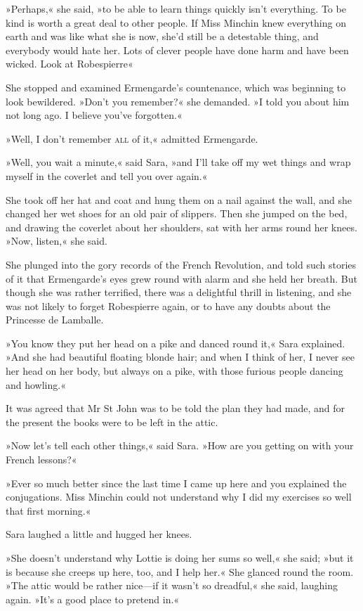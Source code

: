 »Perhaps,« she said, »to be able to learn things quickly isn't everything. To be kind is worth a great deal to other people. If Miss Minchin knew everything on earth and was like what she is now, she'd still be a detestable thing, and everybody would hate her. Lots of clever people have done harm and have been wicked. Look at Robespierre\longdash«

She stopped and examined Ermengarde's countenance, which was beginning to look bewildered. »Don't you remember?« she demanded. »I told you about him not long ago. I believe you've forgotten.«

»Well, I don't remember \textsc{all} of it,« admitted Ermengarde.

»Well, you wait a minute,« said Sara, »and I'll take off my wet things and wrap myself in the coverlet and tell you over again.«

She took off her hat and coat and hung them on a nail against the wall, and she changed her wet shoes for an old pair of slippers. Then she jumped on the bed, and drawing the coverlet about her shoulders, sat with her arms round her knees. »Now, listen,« she said.

She plunged into the gory records of the French Revolution, and told such stories of it that Ermengarde's eyes grew round with alarm and she held her breath. But though she was rather terrified, there was a delightful thrill in listening, and she was not likely to forget Robespierre again, or to have any doubts about the Princesse de Lamballe.

»You know they put her head on a pike and danced round it,« Sara explained. »And she had beautiful floating blonde hair; and when I think of her, I never see her head on her body, but always on a pike, with those furious people dancing and howling.«

It was agreed that Mr St John was to be told the plan they had made, and for the present the books were to be left in the attic.

»Now let's tell each other things,« said Sara. »How are you getting on with your French lessons?«

»Ever so much better since the last time I came up here and you explained the conjugations. Miss Minchin could not understand why I did my exercises so well that first morning.«

Sara laughed a little and hugged her knees.

»She doesn't understand why Lottie is doing her sums so well,« she said; »but it is because she creeps up here, too, and I help her.« She glanced round the room. »The attic would be rather nice—if it wasn't so dreadful,« she said, laughing again. »It's a good place to pretend in.«


